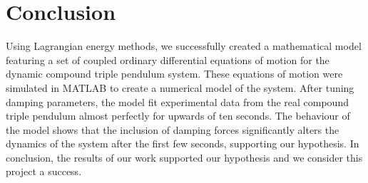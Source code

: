 \section{Conclusion}
Using Lagrangian energy methods, we successfully created a mathematical model featuring a set of coupled ordinary differential equations of motion for the dynamic compound triple pendulum system.  These equations of motion were simulated in MATLAB to create a numerical model of the system.
After tuning damping parameters, the model fit experimental data from the real compound triple pendulum almost perfectly for upwards of ten seconds. 
The behaviour of the model shows that the inclusion of damping forces significantly alters the dynamics of the system after the first few seconds, supporting our hypothesis.  In conclusion, the results of our work supported our hypothesis and we consider this project a success.

